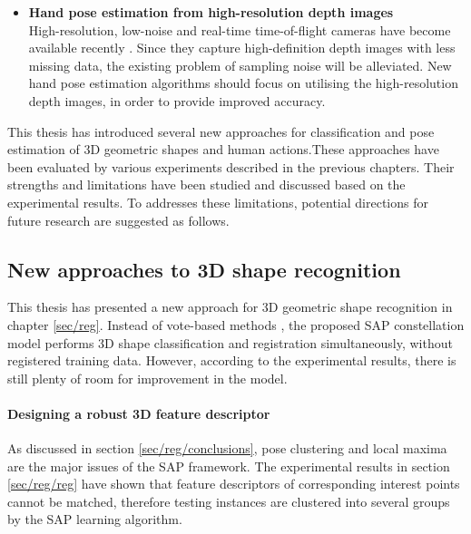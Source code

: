 \begin{itemize}
	\item \textbf{Hand pose estimation from high-resolution depth images}\\
	High-resolution, low-noise and real-time time-of-flight cameras have become available recently \cite{Nair2012}. Since they capture high-definition depth images with less missing data, the existing problem of sampling noise will be alleviated. New hand pose estimation algorithms should focus on utilising the high-resolution depth images, in order to provide improved accuracy.  
\end{itemize}
\fi

This thesis has introduced several new approaches for classification and pose estimation of 3D geometric shapes and human actions.These approaches have been evaluated by various experiments described in the previous chapters. Their strengths and limitations have been studied and discussed based on the experimental results. To addresses these limitations, potential directions for future research are suggested as follows.

\subsection{New approaches to 3D shape recognition}

This thesis has presented a new approach for 3D geometric shape recognition in chapter \ref{sec/reg}. Instead of vote-based methods \cite{Flitton2010, Knopp2010, Pham2011}, the proposed SAP constellation model performs 3D shape classification and registration simultaneously, without registered training data. However, according to the experimental results, there is still plenty of room for improvement in the model. 

\paragraph{Designing a robust 3D feature descriptor}

As discussed in section \ref{sec/reg/conclusions}, pose clustering and local maxima are the major issues of the SAP framework. The experimental results in section \ref{sec/reg/reg} have shown that feature descriptors of corresponding interest points cannot be matched, therefore testing instances are clustered into several groups by the SAP learning algorithm.  

